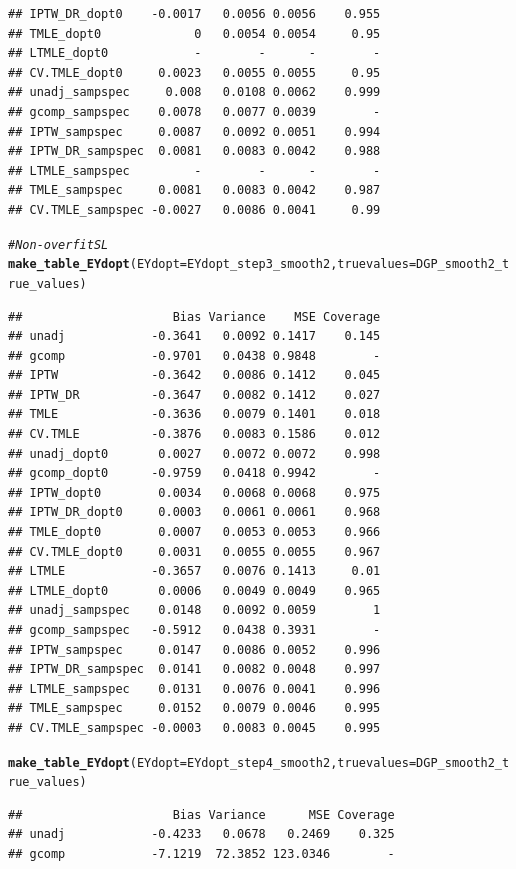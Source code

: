 \documentclass[11pt]{article}\usepackage[]{graphicx}\usepackage[]{color}
\makeatletter
\newcommand{\hlcom}[1]{\textcolor[rgb]{0.678,0.584,0.686}{\textit{#1}}}%
\newcommand{\hlstd}[1]{\textcolor[rgb]{0.345,0.345,0.345}{#1}}%
\newcommand{\hlkwc}[1]{\textcolor[rgb]{0.333,0.667,0.333}{#1}}%
\newcommand{\hlkwd}[1]{\textcolor[rgb]{0.737,0.353,0.396}{\textbf{#1}}}%
\newenvironment{kframe}{%
 \def\at@end@of@kframe{}%
 \ifinner\ifhmode%
  \def\at@end@of@kframe{\end{minipage}}%
  \begin{minipage}{\columnwidth}%
 \fi\fi%
 \def\FrameCommand##1{\hskip\@totalleftmargin \hskip-\fboxsep
 \colorbox{shadecolor}{##1}\hskip-\fboxsep
     \hskip-\linewidth \hskip-\@totalleftmargin \hskip\columnwidth}%
 \MakeFramed {\advance\hsize-\width
   \@totalleftmargin\z@ \linewidth\hsize
   \@setminipage}}%
 {\par\unskip\endMakeFramed%
 \at@end@of@kframe}
\newenvironment{knitrout}{}{} %
\makeatother
\begin{document}
\begin{knitrout}
\begin{kframe}
\begin{verbatim}
## IPTW_DR_dopt0    -0.0017   0.0056 0.0056    0.955
## TMLE_dopt0             0   0.0054 0.0054     0.95
## LTMLE_dopt0            -        -      -        -
## CV.TMLE_dopt0     0.0023   0.0055 0.0055     0.95
## unadj_sampspec     0.008   0.0108 0.0062    0.999
## gcomp_sampspec    0.0078   0.0077 0.0039        -
## IPTW_sampspec     0.0087   0.0092 0.0051    0.994
## IPTW_DR_sampspec  0.0081   0.0083 0.0042    0.988
## LTMLE_sampspec         -        -      -        -
## TMLE_sampspec     0.0081   0.0083 0.0042    0.987
## CV.TMLE_sampspec -0.0027   0.0086 0.0041     0.99
\end{verbatim}
\begin{alltt}
\hlcom{# Non-overfit SL}
\hlkwd{make_table_EYdopt}\hlstd{(}\hlkwc{EYdopt} \hlstd{= EYdopt_step3_smooth2,} \hlkwc{truevalues} \hlstd{= DGP_smooth2_true_values)}
\end{alltt}
\begin{verbatim}
##                     Bias Variance    MSE Coverage
## unadj            -0.3641   0.0092 0.1417    0.145
## gcomp            -0.9701   0.0438 0.9848        -
## IPTW             -0.3642   0.0086 0.1412    0.045
## IPTW_DR          -0.3647   0.0082 0.1412    0.027
## TMLE             -0.3636   0.0079 0.1401    0.018
## CV.TMLE          -0.3876   0.0083 0.1586    0.012
## unadj_dopt0       0.0027   0.0072 0.0072    0.998
## gcomp_dopt0      -0.9759   0.0418 0.9942        -
## IPTW_dopt0        0.0034   0.0068 0.0068    0.975
## IPTW_DR_dopt0     0.0003   0.0061 0.0061    0.968
## TMLE_dopt0        0.0007   0.0053 0.0053    0.966
## CV.TMLE_dopt0     0.0031   0.0055 0.0055    0.967
## LTMLE            -0.3657   0.0076 0.1413     0.01
## LTMLE_dopt0       0.0006   0.0049 0.0049    0.965
## unadj_sampspec    0.0148   0.0092 0.0059        1
## gcomp_sampspec   -0.5912   0.0438 0.3931        -
## IPTW_sampspec     0.0147   0.0086 0.0052    0.996
## IPTW_DR_sampspec  0.0141   0.0082 0.0048    0.997
## LTMLE_sampspec    0.0131   0.0076 0.0041    0.996
## TMLE_sampspec     0.0152   0.0079 0.0046    0.995
## CV.TMLE_sampspec -0.0003   0.0083 0.0045    0.995
\end{verbatim}
\begin{alltt}
\hlkwd{make_table_EYdopt}\hlstd{(}\hlkwc{EYdopt} \hlstd{= EYdopt_step4_smooth2,} \hlkwc{truevalues} \hlstd{= DGP_smooth2_true_values)}
\end{alltt}
\begin{verbatim}
##                     Bias Variance      MSE Coverage
## unadj            -0.4233   0.0678   0.2469    0.325
## gcomp            -7.1219  72.3852 123.0346        -

\end{verbatim}
\end{kframe}
\end{knitrout}
\end{document}
